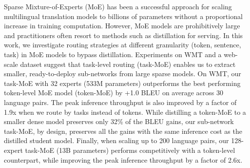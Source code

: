 Sparse Mixture-of-Experts (MoE) has been a successful approach for scaling multilingual translation models to billions of parameters without a proportional increase in training computation. However, MoE models are prohibitively large and practitioners often resort to methods such as distillation for serving. In this work, we investigate routing strategies at different granularity (token, sentence, task) in MoE models to bypass distillation. Experiments on WMT and a web-scale dataset suggest that task-level routing (task-MoE) enables us to extract smaller, ready-to-deploy sub-networks from large sparse models. On WMT, our task-MoE with 32 experts (533M parameters) outperforms the best performing token-level MoE model (token-MoE) by +1.0 BLEU on average across 30 language pairs. The peak inference throughput is also improved by a factor of 1.9x when we route by tasks instead of tokens. While distilling a token-MoE to a smaller dense model preserves only 32\% of the BLEU gains, our sub-network task-MoE, by design, preserves all the gains with the same inference cost as the distilled student model. Finally, when scaling up to 200 language pairs, our 128-expert task-MoE (13B parameters) performs competitively with a token-level counterpart, while improving the peak inference throughput by a factor of 2.6x.
